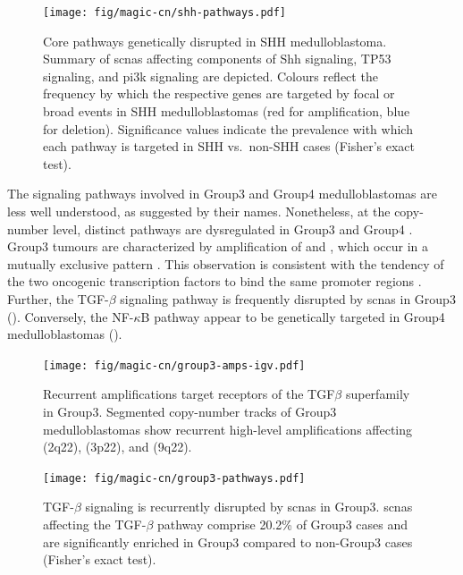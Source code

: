 \begin{figure}[5]
	\centering
	\texttt{[image: fig/magic-cn/shh-pathways.pdf]}
	\caption[Core pathways genetically disrupted in SHH medulloblastoma]
	{
	Core pathways genetically disrupted in SHH medulloblastoma.
	Summary of \gls{scnas} affecting components of Shh signaling, TP53 signaling, and \gls{pi3k} signaling are depicted. Colours reflect the frequency by which the respective genes are targeted by focal or broad events in SHH medulloblastomas (red for amplification, blue for deletion). Significance values indicate the prevalence with which each pathway is targeted in SHH vs.\ non-SHH cases (Fisher's exact test).
	}
	\label{fig:shh-pathways}
\end{figure}

\clearpage

The signaling pathways involved in Group3 and Group4 medulloblastomas are less well understood, as suggested by their names. Nonetheless, at the copy-number level, distinct pathways are dysregulated in Group3 and Group4 . Group3 tumours are characterized by amplification of  and , which occur in a mutually exclusive pattern . This observation is consistent with the tendency of the two oncogenic transcription factors to bind the same promoter regions . Further, the TGF-$\beta$ signaling pathway is frequently disrupted by \gls{scnas} in Group3 (). Conversely, the NF-$\kappa$B pathway appear to be genetically targeted in Group4 medulloblastomas ().

\begin{figure}
	\centering
	\texttt{[image: fig/magic-cn/group3-amps-igv.pdf]}
	\caption[Recurrent amplifications target receptors of the TGF$\beta$ superfamily in Group3]
	{
		Recurrent amplifications target receptors of the TGF$\beta$ superfamily in Group3.
		Segmented copy-number tracks of Group3 medulloblastomas show recurrent high-level amplifications affecting  (2q22),  (3p22), and  (9q22).
	}
	\label{fig:group3-amps-igv}
\end{figure}

\begin{figure}
	\centering
	\texttt{[image: fig/magic-cn/group3-pathways.pdf]}
	\caption[TGF-$\beta$ signaling is recurrently disrupted by \gls{scnas} in Group3]
	{
		TGF-$\beta$ signaling is recurrently disrupted by \gls{scnas} in Group3.
		\gls{scnas} affecting the TGF-$\beta$ pathway comprise 20.2\% of Group3 cases and are significantly enriched in Group3 compared to non-Group3 cases (Fisher's exact test).
	}
	\label{fig:group3-pathways}
\end{figure}

